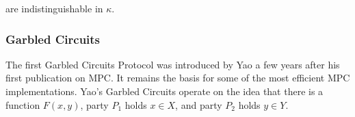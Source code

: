 are indistinguishable in $\kappa$.




\subsubsection{Garbled Circuits}

The first Garbled Circuits Protocol was introduced by Yao a few years after his first publication on MPC. It remains the basis for some of the most efficient MPC implementations. Yao's Garbled Circuits operate on the idea that there is a function $F(x,y)$, party $P_1$ holds $x \in X$, and party $P_2$ holds $y \in Y$.








